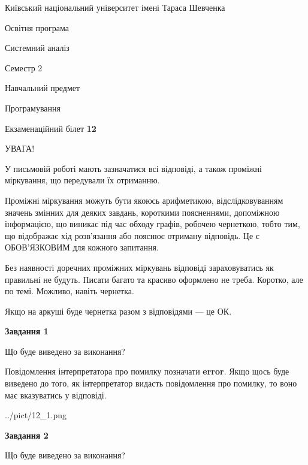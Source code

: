 \documentclass[12pt, ukrainian]{article}
\begin{document}
{{\begin {small}\par
{ \center  Київський національний університет імені Тараса Шевченка \par}
{\parbox {5 cm}{Освітня програма \hfill}{\parbox {7 cm}{Системний аналіз \hfill}}\parbox {6 cm}{\hfill Семестр 2}}\par
{\parbox {5 cm} {Навчальний предмет \hfill}\parbox {7 cm}{Програмування \hfill}\parbox {6cm}{\hfill}\par}\vspace{-7pt} \end{small}}{\center Екзаменаційний білет \No \textbf
{ 12 }\par}}
{
\begin {large}
УВАГА!

У письмовій роботі мають зазначатися всі відповіді, а також проміжні міркування, що передували їх отриманню.

Проміжні міркування можуть бути якоюсь арифметикою, відслідковуванням зна\-чень змінних для деяких завдань,
короткими поясненнями, допоміжною інформацією, що виникає під час обходу графів, робочею чернеткою,
тобто тим, що відображає хід розв’язання або пояснює отриману відповідь.
Це є ОБОВ’ЯЗКОВИМ для кожного запитання.

Без наявності доречних проміжних міркувань відповіді зараховуватись як правиль\-ні не будуть.
Писати багато та красиво оформлено не треба. Коротко, але по темі. Можли\-во, навіть чернетка.

Якщо на аркуші буде чернетка разом з відповідями --- це ОК.

\newpage

{\begin {center}\textbf{Завдання 1}\end {center}}\par
Що буде виведено за виконання?

Повідомлення інтерпретатора про помилку позначати \textbf{error}.
Якщо щось буде виведено до того, як інтерпретатор видасть повідомлення про помилку, 
то воно має вказуватись у відповіді. \par


\begin{center}
	{../pict/12_1.png}
\end{center}
\newpage

{\begin {center}\textbf{Завдання 2}\end {center}}\par
Що буде виведено за виконання?


\end{large}}
\end{document}
